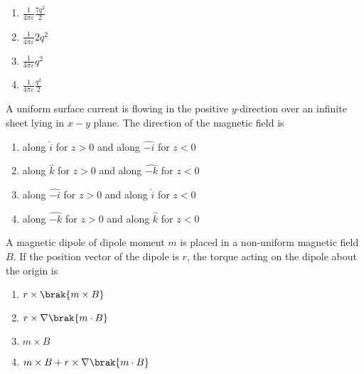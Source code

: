 	\begin{center}
		\begin{enumerate}
	\item $\frac{1}{4\pi\varepsilon}\frac{7q^2}{2}$
	\item $\frac{1}{4\pi\varepsilon}2q^2$
	\item $\frac{1}{4\pi\varepsilon}q^2$
	\item $\frac{1}{4\pi\varepsilon}\frac{q^2}{2}$
		\end{enumerate}
\end{center}
\item A uniform surface current is flowing in the positive $y$-direction over an infinite sheet lying in $x-y$ plane. The direction of the magnetic field is 
	\begin{enumerate}
\item along $\hat{i}$ for $z>0$ and along $\hat{-i}$ for $z<0$
\item along $\hat{k}$ for $z>0$ and along $\hat{-k}$ for $z<0$
\item along $\hat{-i}$ for $z>0$ and along $\hat{i}$ for $z<0$
\item along $\hat{-k}$ for $z>0$ and along $\hat{k}$ for $z<0$
	\end{enumerate}
\item A magnetic dipole of dipole moment $m$ is placed in a non-uniform magnetic field $B$. If the position vector of the dipole is $r$, the torque acting on the dipole about the origin is
	\begin{enumerate}
\item $r\times\brak{m\times B}$
\item $r\times \nabla \brak{m\cdot B}$
\item $m\times B$
\item $m\times B+ r \times\nabla\brak{m\cdot B}$
	\end{enumerate}

